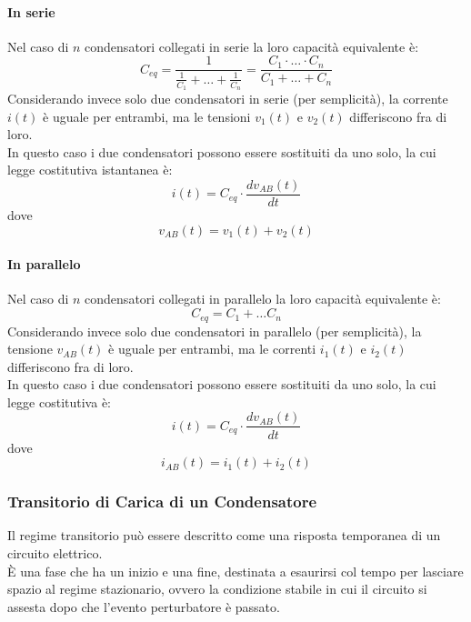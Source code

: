 \documentclass[../main.tex]{subfiles}
\begin{document}
	\paragraph{In serie}
	Nel caso di $n$ condensatori collegati in serie la loro capacità equivalente è:
	\begin{equation}
		C_{eq} = \frac{1}{\frac{1}{C_1} + \dots + \frac{1}{C_n}} = \frac{C_1 \cdot \dots \cdot C_n}{C_1 + \dots + C_n}
	\end{equation}
	Considerando invece solo due condensatori in serie (per semplicità), la corrente $i(t)$ è uguale per entrambi, ma le tensioni $v_1(t)$ e $v_2(t)$ differiscono fra di loro.\\
	In questo caso i due condensatori possono essere sostituiti da uno solo, la cui legge costitutiva istantanea è:
	\begin{equation}
		i(t) = C_{eq} \cdot \frac{dv_{AB}(t)}{dt}
	\end{equation}
	dove 
	\begin{equation}
		v_{AB}(t) = v_1(t) + v_2(t)
	\end{equation}
	\paragraph{In parallelo}
	Nel caso di $n$ condensatori collegati in parallelo la loro capacità equivalente è:
	\begin{equation}
		C_{eq} = C_1 + \dots C_n
	\end{equation}
	Considerando invece solo due condensatori in parallelo (per semplicità), la tensione $v_{AB}(t)$ è uguale per entrambi, ma le correnti $i_1(t)$ e $i_2(t)$ differiscono fra di loro.\\
	In questo caso i due condensatori possono essere sostituiti da uno solo, la cui legge costitutiva è:
	\begin{equation}
		i(t) = C_{eq} \cdot \frac{dv_{AB}(t)}{dt}
	\end{equation}
	dove 
	\begin{equation}
		i_{AB}(t) = i_1(t) + i_2(t)
	\end{equation}
	\subsubsection{Transitorio di Carica di un Condensatore}
	\begin{definition}
		Il regime transitorio può essere descritto come una risposta temporanea di un circuito elettrico. \\
		È una fase che ha un inizio e una fine, destinata a esaurirsi col tempo per lasciare spazio al regime stazionario, ovvero la condizione stabile in cui il circuito si assesta dopo che l'evento perturbatore è passato.
	\end{definition}
\end{document}
